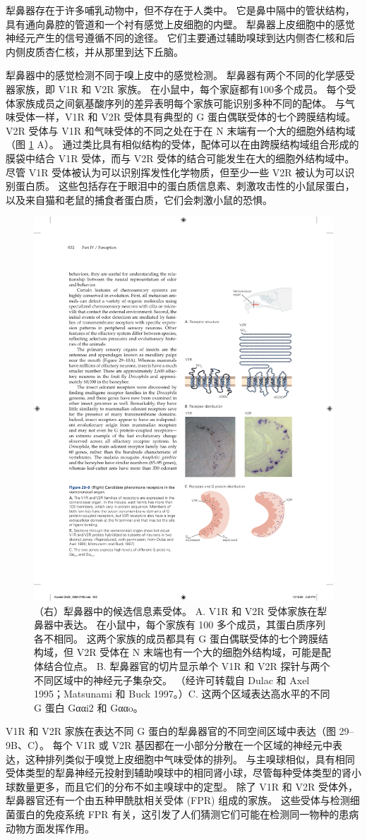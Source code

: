 犁鼻器存在于许多哺乳动物中，但不存在于人类中。 它是鼻中隔中的管状结构，具有通向鼻腔的管道和一个衬有感觉上皮细胞的内壁。 犁鼻器上皮细胞中的感觉神经元产生的信号遵循不同的途径。 它们主要通过辅助嗅球到达内侧杏仁核和后内侧皮质杏仁核，并从那里到达下丘脑。

犁鼻器中的感觉检测不同于嗅上皮中的感觉检测。 犁鼻器有两个不同的化学感受器家族，即 V1R 和 V2R 家族。 在小鼠中，每个家庭都有100多个成员。 每个受体家族成员之间氨基酸序列的差异表明每个家族可能识别多种不同的配体。 与气味受体一样，V1R 和 V2R 受体具有典型的 G 蛋白偶联受体的七个跨膜结构域。 
V2R 受体与 V1R 和气味受体的不同之处在于在 N 末端有一个大的细胞外结构域（图 \ref{fig:29_9} A）。 
通过类比具有相似结构的受体，配体可以在由跨膜结构域组合形成的膜袋中结合 V1R 受体，而与 V2R 受体的结合可能发生在大的细胞外结构域中。 尽管 V1R 受体被认为可以识别挥发性化学物质，但至少一些 V2R 被认为可以识别蛋白质。 这些包括存在于眼泪中的蛋白质信息素、刺激攻击性的小鼠尿蛋白，以及来自猫和老鼠的捕食者蛋白质，它们会刺激小鼠的恐惧。

\begin{figure}[htbp]
	\centering
	\includegraphics[width=0.5\linewidth]{chap29/fig_29_9}
	\caption{（右）犁鼻器中的候选信息素受体。 A. V1R 和 V2R 受体家族在犁鼻器中表达。 在小鼠中，每个家族有 100 多个成员，其蛋白质序列各不相同。 这两个家族的成员都具有 G 蛋白偶联受体的七个跨膜结构域，但 V2R 受体在 N 末端也有一个大的细胞外结构域，可能是配体结合位点。 B. 犁鼻器官的切片显示单个 V1R 和 V2R 探针与两个不同区域中的神经元子集杂交。 （经许可转载自 Dulac 和 Axel 1995；Matsunami 和 Buck 1997。）C. 这两个区域表达高水平的不同 G 蛋白 Gααi2 和 Gααo。}
	\label{fig:29_9}
\end{figure}


V1R 和 V2R 家族在表达不同 G 蛋白的犁鼻器官的不同空间区域中表达（图 29–9B、C）。 每个 V1R 或 V2R 基因都在一小部分分散在一个区域的神经元中表达，这种排列类似于嗅觉上皮细胞中气味受体的排列。 与主嗅球相似，具有相同受体类型的犁鼻神经元投射到辅助嗅球中的相同肾小球，尽管每种受体类型的肾小球数量更多，而且它们的分布不如主嗅球中的定型。 除了 V1R 和 V2R 受体外，犁鼻器官还有一个由五种甲酰肽相关受体 (FPR) 组成的家族。 这些受体与检测细菌蛋白的免疫系统 FPR 有关，这引发了人们猜测它们可能在检测同一物种的患病动物方面发挥作用。


